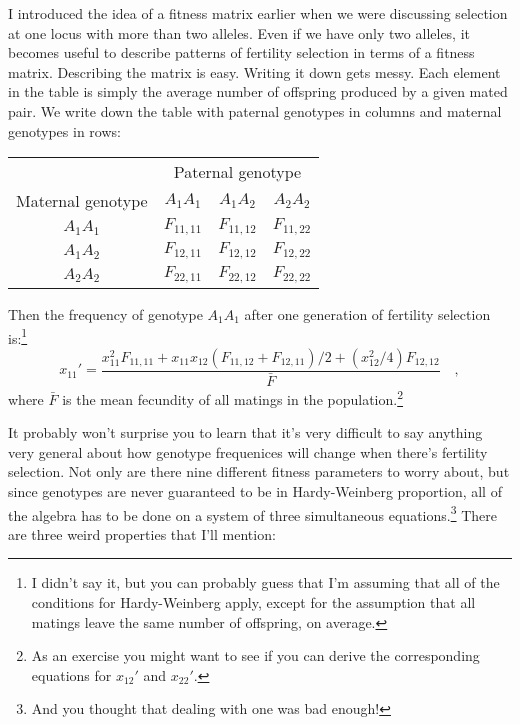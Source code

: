 I introduced the idea of a fitness matrix earlier when we were
discussing selection at one locus with more than two alleles. Even if
we have only two alleles, it becomes useful to describe patterns of
fertility selection in terms of a fitness matrix. Describing the
matrix is easy. Writing it down gets messy. Each element in the table
is simply the average number of offspring produced by a given mated
pair. We write down the table with paternal genotypes in columns and
maternal genotypes in rows:
\begin{center}
\begin{tabular}{c|ccc}
\hline\hline
                  & \multicolumn{3}{c}{Paternal genotype} \\
Maternal genotype & $A_1A_1$ & $A_1A_2$ & $A_2A_2$ \\
\hline
$A_1A_1$ & $F_{11,11}$ & $F_{11,12}$ & $F_{11,22}$ \\
$A_1A_2$ & $F_{12,11}$ & $F_{12,12}$ & $F_{12,22}$ \\
$A_2A_2$ & $F_{22,11}$ & $F_{22,12}$ & $F_{22,22}$ \\
\hline
\end{tabular}
\end{center}
Then the frequency of genotype $A_1A_1$ after one generation of
fertility selection is:\footnote{I didn't say it, but you can probably
  guess that I'm assuming that all of the conditions for
  Hardy-Weinberg apply, except for the assumption that all matings
  leave the same number of offspring, on average.}
\begin{equation}
x_{11}' = \frac{x_{11}^2F_{11,11} + x_{11}x_{12}(F_{11,12} +
                F_{12,11})/2 + (x_{12}^2/4)F_{12,12}}{\bar F} \quad ,
\label{eq:fertility}
\end{equation}
where $\bar F$ is the mean fecundity of all matings in the
population.\footnote{As an exercise you might want to see if you can
derive the corresponding equations for $x_{12}'$ and $x_{22}'$.} 

It probably won't surprise you to learn that it's very difficult to
say anything very general about how genotype frequenices will change
when there's fertility selection. Not only are there nine different
fitness parameters to worry about, but since genotypes are never
guaranteed to be in Hardy-Weinberg proportion, all of the algebra has
to be done on a system of three simultaneous equations.\footnote{And
you thought that dealing with one was bad enough!} There are three
weird properties that I'll mention:

